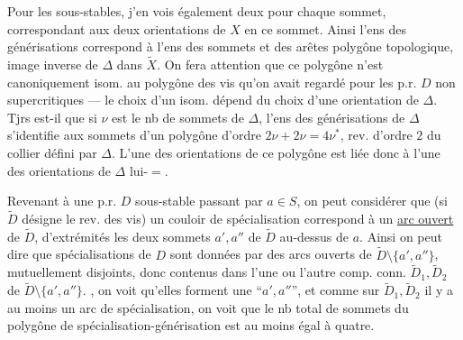 
Pour les sous-stables, j'en vois également deux pour chaque sommet, correspondant aux deux orientations de $X$ en ce sommet. Ainsi l'ens des  générisations correspond à l'ens des sommets et des arêtes  polygône topologique, image inverse de $\Delta$ dans $\widetilde X$. On fera attention que ce polygône n'est  canoniquement isom. au polygône des vis qu'on avait regardé pour les p.r. $D$ non supercritiques --- le choix d'un isom. dépend du choix d'une orientation de $\Delta$. Tjrs est-il que si $\nu$ est le nb de sommets de $\Delta$, l'ens des générisations  de $\Delta$ s'identifie aux sommets d'un  polygône  d'ordre \uline{$2\nu+2\nu=4\nu$}$^*$, rev. d'ordre $2$ du collier défini par $\Delta$. L'une des orientations de ce polygône est liée donc à l'une des orientations de $\Delta$ lui-$=$.




Revenant à une p.r. $D$ sous-stable passant par $a\in S$, on peut considérer que  (si $\widetilde D$ désigne le rev. des vis) un couloir de spécialisation correspond à un \uline{arc ouvert} de $\widetilde D$, d'extrémités les deux sommets $a',a''$ de $\widetilde D$ au-dessus de $a$.   Ainsi on peut dire que  spécialisations de $D$ sont données par des arcs ouverts de $\widetilde D\setminus\{a',a''\}$, mutuellement disjoints, donc contenus dans l'une ou l'autre comp. conn. $\widetilde D_1,\widetilde D_2$ de $\widetilde D\setminus\{a',a''\}$. , on voit qu'elles forment une  ``$a',a''$'', et comme sur $\widetilde D_1,\widetilde D_2$ il y a au moins un arc de spécialisation, on voit que le nb total de sommets du polygône de spécialisation-générisation est au moins égal à quatre. 

